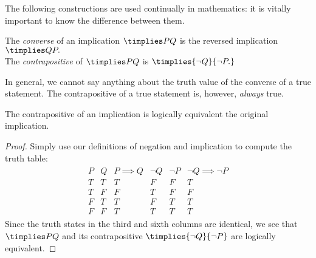 The following constructions are used continually in mathematics: it is vitally important to know the difference between them.

\begin{defn}\label{defn:contra}
The \emph{converse} of an implication $\timplies PQ$ is the reversed implication $\timplies Q{P.}$\\
The \emph{contrapositive} of $\timplies PQ$ is $\timplies{\neg Q}{\neg P.}$
\end{defn}

\noindent In general, we cannot say anything about the truth value of the converse of a true statement. The contrapositive of a true statement is, however, \emph{always} true.

\begin{thm}\label{thm:contrapos}
The contrapositive of an implication is logically equivalent the original implication.
\end{thm}

\begin{proof}
Simply use our definitions of negation and implication to compute the truth table:
\begin{gather*}
\begin{array}{cc|c||cc|c}
P & Q & P\implies Q & \neg Q & \neg P & \neg Q\implies\neg P\\\hline
T & T & T & F & F & T\\
T & F & F & T & F & F\\
F & T & T & F & T & T\\
F & F & T & T & T & T
\end{array}
\end{gather*}
Since the truth states in the third and sixth columns are identical, we see that $\timplies PQ$ and its contrapositive $\timplies{\neg Q}{\neg P}$ are logically equivalent.
\end{proof}

